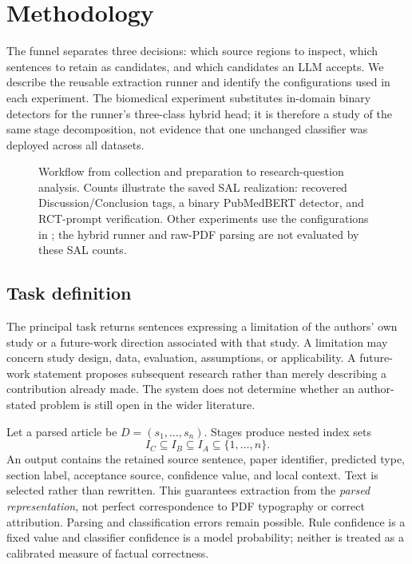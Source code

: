 \section{Methodology}
\label{S:methodology}

The funnel separates three decisions: which source regions to inspect, which sentences to retain
as candidates, and which candidates an LLM accepts. We describe the reusable extraction runner
and identify the configurations used in each experiment. The biomedical experiment substitutes
in-domain binary detectors for the runner's three-class hybrid head; it is therefore a study of
the same stage decomposition, not evidence that one unchanged classifier was deployed across all datasets.

\begin{figure}[t]
\centering

\caption{Workflow from collection and preparation to research-question analysis.
Counts illustrate the saved SAL realization: recovered
Discussion/Conclusion tags, a binary PubMedBERT detector, and RCT-prompt verification. Other
experiments use the configurations in ; the hybrid runner
and raw-PDF parsing are not evaluated by these SAL counts.}
\label{F:pipeline}
\end{figure}

\subsection{Task definition}
\label{S:task}

The principal task returns sentences expressing a limitation of the authors' own study or a
future-work direction associated with that study. A limitation may concern study design, data,
evaluation, assumptions, or applicability. A future-work statement proposes subsequent research
rather than merely describing a contribution already made. The system does not determine whether
an author-stated problem is still open in the wider literature.

Let a parsed article be $D=(s_1,\ldots,s_n)$. Stages produce nested index sets
\begin{equation}
 I_C\subseteq I_B\subseteq I_A\subseteq\{1,\ldots,n\}.
\end{equation}
An output contains the retained source sentence, paper identifier, predicted type, section label,
acceptance source, confidence value, and local context. Text is selected rather than rewritten.
This guarantees extraction from the \emph{parsed representation}, not perfect correspondence to
PDF typography or correct attribution. Parsing and classification errors remain possible. Rule
confidence is a fixed value and classifier confidence is a model probability; neither is treated
as a calibrated measure of factual correctness.

